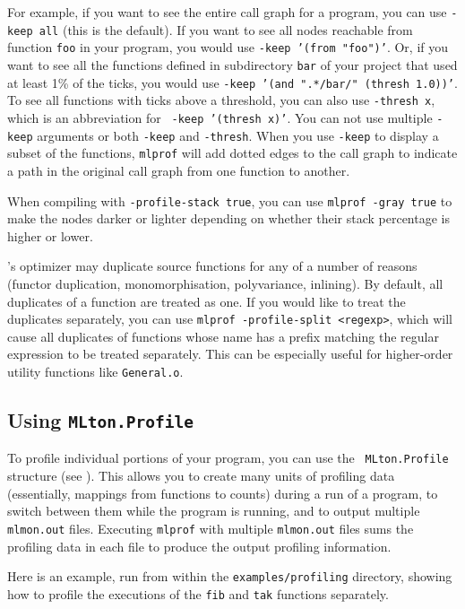 For example, if you want to see the entire call graph for a program,
you can use {\tt -keep all} (this is the default).  If you want to see
all nodes reachable from function {\tt foo} in your program, you would
use {\tt -keep '(from "foo")'}.  Or, if you want to see all the
functions defined in subdirectory {\tt bar} of your project that used
at least 1\% of the ticks, you would use {\tt -keep '(and ".*/bar/"
(thresh 1.0))'}.  To see all functions with ticks above a threshold,
you can also use {\tt -thresh x}, which is an abbreviation for {\tt
-keep '(thresh x)'}.  You can not use multiple {\tt -keep} arguments
or both {\tt -keep} and {\tt -thresh}.  When you use {\tt -keep} to
display a subset of the functions, {\tt mlprof} will add dotted edges
to the call graph to indicate a path in the original call graph from
one function to another.

When compiling with {\tt -profile-stack true}, you can use {\tt mlprof
-gray true} to make the nodes darker or lighter depending on whether
their stack percentage is higher or lower.

{\mlton}'s optimizer may duplicate source functions for any of a
number of reasons (functor duplication, monomorphisation,
polyvariance, inlining).  By default, all duplicates of a function are
treated as one.  If you would like to treat the duplicates separately,
you can use {\tt mlprof -profile-split <regexp>}, which will cause all
duplicates of functions whose name has a prefix matching the regular
expression to be treated separately.  This can be especially useful
for higher-order utility functions like {\tt General.o}.

\subsection{Using {\tt MLton.Profile}}

To profile individual portions of your program, you can use the {\tt
MLton.Profile} structure (see ).  This
allows you to create many units of profiling data (essentially,
mappings from functions to counts) during a run of a program, to
switch between them while the program is running, and to output
multiple {\tt mlmon.out} files.  Executing {\tt mlprof} with multiple
{\tt mlmon.out} files sums the profiling data in each file to produce
the output profiling information.

Here is an example, run from within the {\tt examples/profiling}
directory, showing how to profile the executions of the {\tt fib} and
{\tt tak} functions separately.

